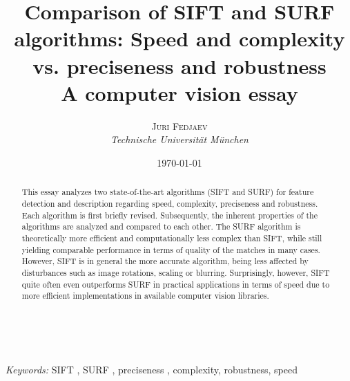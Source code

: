\documentclass[a4paper, 11pt]{article} %
\title{\textbf{Comparison of SIFT and SURF algorithms: Speed and complexity vs. preciseness and robustness}\\ %
A computer vision essay} %
\author{\textsc{Juri Fedjaev} %
\\{\textit{Technische Universit\"at M\"unchen}}} %
\date{\today} %
\makeatletter
\renewcommand{\maketitle}{ %
\begin{flushright} %
{\LARGE\@title} %

\vspace{50pt} %

{\large\@author} %
\\\@date %

\vspace{40pt} %
\end{flushright}
}
\makeatother
\begin{document}
\maketitle %



\begin{abstract}
This essay analyzes two state-of-the-art algorithms (SIFT and SURF) for feature detection and description regarding speed, complexity, preciseness and robustness. Each algorithm is first briefly revised. Subsequently, the inherent properties of the algorithms are analyzed and compared to each other. The SURF algorithm is theoretically more efficient and computationally less complex than SIFT, while still yielding comparable performance in terms of quality of the matches in many cases. However, SIFT is in general the more accurate algorithm, being less affected by disturbances such as image rotations, scaling or blurring. Surprisingly, however, SIFT quite often even outperforms SURF in practical applications in terms of speed due to more efficient implementations in available computer vision libraries.

\end{abstract}

\hspace*{3,6mm}\textit{Keywords:} SIFT , SURF , preciseness , complexity, robustness, speed %

\vspace{30pt} %

\end{document}
